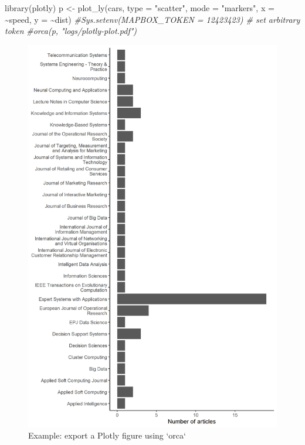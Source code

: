 \documentclass[
  12pt,
]{article}
\newenvironment{Shaded}{\begin{snugshade}}{\end{snugshade}}
\newcommand{\AttributeTok}[1]{\textcolor[rgb]{0.77,0.63,0.00}{#1}}
\newcommand{\CommentTok}[1]{\textcolor[rgb]{0.56,0.35,0.01}{\textit{#1}}}
\newcommand{\FunctionTok}[1]{\textcolor[rgb]{0.00,0.00,0.00}{#1}}
\newcommand{\NormalTok}[1]{#1}
\newcommand{\OtherTok}[1]{\textcolor[rgb]{0.56,0.35,0.01}{#1}}
\newcommand{\SpecialCharTok}[1]{\textcolor[rgb]{0.00,0.00,0.00}{#1}}
\newcommand{\StringTok}[1]{\textcolor[rgb]{0.31,0.60,0.02}{#1}}
\begin{document}
\begin{Shaded}
\begin{Highlighting}[]
\FunctionTok{library}\NormalTok{(plotly)}
\NormalTok{p }\OtherTok{\textless{}{-}} \FunctionTok{plot\_ly}\NormalTok{(cars, }\AttributeTok{type =} \StringTok{"scatter"}\NormalTok{, }\AttributeTok{mode =} \StringTok{"markers"}\NormalTok{,}
        \AttributeTok{x =} \SpecialCharTok{\textasciitilde{}}\NormalTok{speed,}
        \AttributeTok{y =} \SpecialCharTok{\textasciitilde{}}\NormalTok{dist)}
\CommentTok{\#Sys.setenv(\textquotesingle{}MAPBOX\_TOKEN\textquotesingle{} = \textquotesingle{}12423423\textquotesingle{}) \# set arbitrary token}
\CommentTok{\#orca(p, "logs/plotly{-}plot.pdf")}
\end{Highlighting}
\end{Shaded}

\begin{figure}[ht]
\centering
\caption{Example: export a Plotly figure using `orca`}\label{fig:fig-3}
    \includegraphics[width = 0.9\linewidth]{../figures/teste.png}
\begin{flushleft}
\end{flushleft}
\end{figure}
\vspace{-1.2cm}
\end{document}

